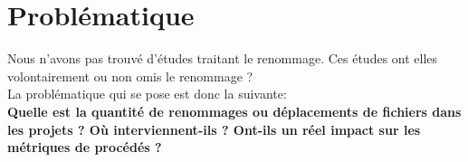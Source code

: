 \section{Problématique}
\label{sec:problematique}
Nous n'avons pas trouvé d'études traitant le renommage. Ces études ont elles volontairement ou non omis le renommage ? \\
La problématique qui se pose est donc la suivante:\\
 \textbf{Quelle est la quantité de renommages ou déplacements de fichiers dans les projets ? Où interviennent-ils ? Ont-ils un réel impact sur les métriques de procédés ?} \\
